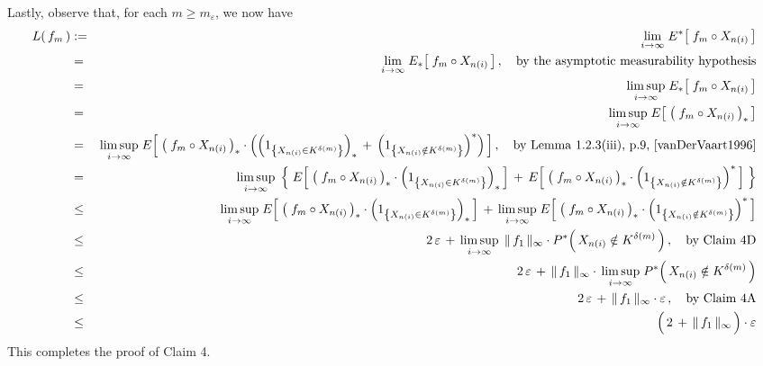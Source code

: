 \vskip 0.8cm
\noindent
Lastly, observe that, for each $m \geq m_{\varepsilon}$, we now have
\begin{eqnarray*}
L(\,f_{m}\,)
&:=&
	\underset{i\rightarrow\infty}{\lim}\; E^{*}\!\left[\; f_{m} \circ X_{n(i)} \,\right]
\\
&=&
	\underset{i\rightarrow\infty}{\lim}\; E_{*}\!\left[\; f_{m} \circ X_{n(i)} \,\right],
	\quad
	\textnormal{by the asymptotic measurability hypothesis}
\\
&=&
	\underset{i\rightarrow\infty}{\limsup}\; E_{*}\!\left[\; f_{m} \circ X_{n(i)} \,\right]
\\
&=&
	\underset{i\rightarrow\infty}{\limsup}\; E\!\left[\; \left(\;f_{m} \circ X_{n(i)}\,\right)_{*} \,\right]
\\
&=&
	\underset{i\rightarrow\infty}{\limsup}\;
	E\!\left[\;
		\left(\;f_{m} \circ X_{n(i)}\,\right)_{*}
		\cdot
		\left(
			\left(1_{\left\{X_{n(i)} \in K^{\delta(m)}\right\}}\right)_{*}
			\,+\,
			\left(1_{\left\{X_{n(i)} \notin K^{\delta(m)}\right\}}\right)^{*}
		\right)
	\,\right],
	\quad\textnormal{by Lemma 1.2.3(iii), p.9, \cite{vanDerVaart1996}}
\\
&=&
	\underset{i\rightarrow\infty}{\limsup}\;
	\left\{\;
		E\!\left[\;
			\left(\;f_{m} \circ X_{n(i)}\,\right)_{*}
			\cdot
			\left(1_{\left\{X_{n(i)} \in K^{\delta(m)}\right\}}\right)_{*}
		\,\right]
		\, + \,
		E\!\left[\;
			\left(\;f_{m} \circ X_{n(i)}\,\right)_{*}
			\cdot
			\left(1_{\left\{X_{n(i)} \notin K^{\delta(m)}\right\}}\right)^{*}
		\,\right]
	\;\right\}
\\
&\leq&
	\underset{i\rightarrow\infty}{\limsup}\;
	E\!\left[\;
		\left(\;f_{m} \circ X_{n(i)}\,\right)_{*}
		\cdot
		\left(1_{\left\{X_{n(i)} \in K^{\delta(m)}\right\}}\right)_{*}
	\,\right]
	\, + \,
	\underset{i\rightarrow\infty}{\limsup}\;
	E\!\left[\;
		\left(\;f_{m} \circ X_{n(i)}\,\right)_{*}
		\cdot
		\left(1_{\left\{X_{n(i)} \notin K^{\delta(m)}\right\}}\right)^{*}
	\,\right]
\\
&\leq&
	2\,\varepsilon
	\, + \,
	\underset{i\rightarrow\infty}{\limsup}\;\,
	\Vert\,f_{1}\,\Vert_{\infty} \cdot P^{*}\!\left(\,X_{n(i)} \notin K^{\delta(m)}\,\right),
	\quad
	\textnormal{by Claim 4D}
\\
&\leq&
	2\,\varepsilon
	\, + \,
	\Vert\,f_{1}\,\Vert_{\infty} \cdot \,
	\underset{i\rightarrow\infty}{\limsup}\;
	P^{*}\!\left(\,X_{n(i)} \notin K^{\delta(m)}\,\right)
\\
&\leq&
	2\,\varepsilon \, + \, \Vert\,f_{1}\,\Vert_{\infty} \cdot \varepsilon\,,
	\quad
	\textnormal{by Claim 4A}
\\
&\leq&
	\left(\,2 \, \overset{{\color{white}.}}{+} \, \Vert\,f_{1}\,\Vert_{\infty} \,\right) \cdot \varepsilon
\end{eqnarray*}
This completes the proof of Claim 4.

